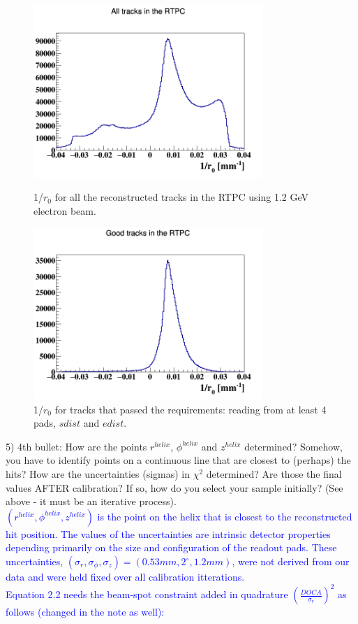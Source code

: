 \begin{figure}[tbp]
\hspace{-1cm}
\begin{minipage}[c]{.46\linewidth}
\includegraphics[height=6.5cm]{fig/rtpc_1overr0_all_before.png}
\caption{1/$r_{0}$ for all the reconstructed tracks in the RTPC using 1.2 GeV 
electron beam.}
\label{fig:1overr0}
\end{minipage} \hfill
\begin{minipage}[c]{.46\linewidth}
\hspace{-0.1in}\includegraphics[height=6.5cm]{fig/rtpc_1overr0_all.png}
\caption{1/$r_{0}$ for tracks that passed the requirements: reading from at 
least 4 pads, $sdist$ and $edist$.}
\label{fig:good_r0}
\end{minipage}
\end{figure}


5) 4th bullet: How are the points $r^{helix}$, $\phi^{helix}$ and $z^{helix}$ 
determined?  Somehow, you have to identify points on a continuous line that are 
closest to (perhaps) the hits? How are the uncertainties (sigmas) in  
$\chi^{2}$ determined?  Are those the final values AFTER calibration? If so, 
how do you select your sample initially? (See above - it must be an iterative 
process).  \\
\textcolor{blue}{$(r^{helix},\phi^{helix},z^{helix})$ is the point
on the helix that is closest to the reconstructed hit position.
The values of the uncertainties are intrinsic detector properties depending
primarily on the size and configuration of the readout pads. These 
uncertainties, $(\sigma_{r}, \sigma_{\phi}, \sigma_{z}) = (0.53 mm, 2^{\circ}, 
1.2 mm)$, were not derived from our data and were held fixed over all 
calibration itterations.} \\
\textcolor{blue}{Equation 2.2 needs the beam-spot constraint added in
quadrature $\left(\frac{DOCA}{\sigma_r}\right)^2$ as follows (changed in 
the note as well): }\\

